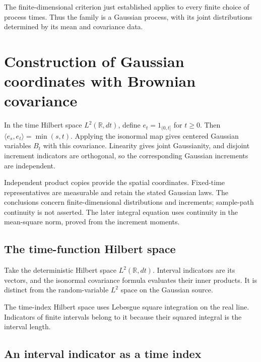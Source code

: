 \documentclass[11pt,a4paper]{article}
\begin{document}
The finite-dimensional criterion just established applies to every finite choice of process times. Thus the family is a Gaussian process, with its joint distributions determined by its mean and covariance data.


\section{\texorpdfstring{Construction of Gaussian coordinates with Brownian covariance}{Construction of Gaussian coordinates with Brownian covariance}}


In the time Hilbert space \(L^2(\mathbb R,dt)\), define \(e_t=1_{(0,t]}\) for \(t\ge0\). Then \(\langle e_s,e_t\rangle=\min(s,t)\). Applying the isonormal map gives centered Gaussian variables \(B_t\) with this covariance. Linearity gives joint Gaussianity, and disjoint increment indicators are orthogonal, so the corresponding Gaussian increments are independent.



Independent product copies provide the spatial coordinates. Fixed-time representatives are measurable and retain the stated Gaussian laws. The conclusions concern finite-dimensional distributions and increments; sample-path continuity is not asserted. The later integral equation uses continuity in the mean-square norm, proved from the increment moments.


\subsection{\texorpdfstring{The time-function Hilbert space}{The time-function Hilbert space}}


Take the deterministic Hilbert space \(L^2(\mathbb R,dt)\). Interval indicators are its vectors, and the isonormal covariance formula evaluates their inner products. It is distinct from the random-variable \(L^2\) space on the Gaussian source.



The time-index Hilbert space uses Lebesgue square integration on the real line. Indicators of finite intervals belong to it because their squared integral is the interval length.


\subsection{\texorpdfstring{An interval indicator as a time index}{An interval indicator as a time index}}
\end{document}
